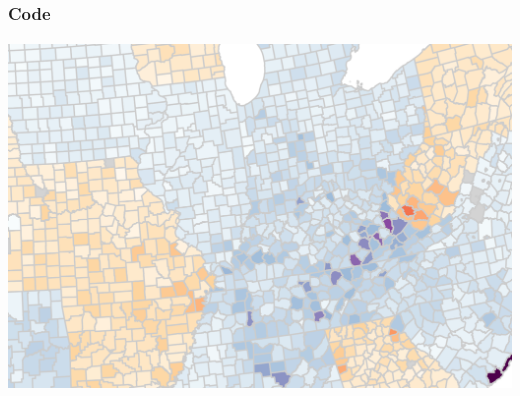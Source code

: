 \begin{frame}

    \label{github_link}
    
    \frametitle{Code} %
    \framesubtitle{}  %
    \rmfamily %
    
    \begin{center}
        \href{https://github.com/guillelozabala/masters_thesis}{\includegraphics[scale=0.4]{thumbnail.png}}
    \end{center}
    
    
\end{frame}

